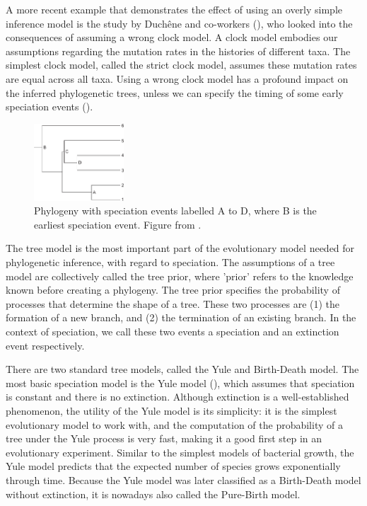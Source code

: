 A more recent example that demonstrates the effect of using an overly simple 
inference model is the study by Duch{\^e}ne and co-workers (\cite{duchene2014impact}),
who looked into the consequences of assuming a wrong clock model. 
A clock model embodies our assumptions regarding the mutation rates in
the histories of different taxa. The simplest clock model, called the strict
clock model, assumes these mutation rates are equal across all taxa.
Using a wrong clock model has a profound impact 
on the inferred phylogenetic trees, unless we can
specify the timing of some early speciation 
events (\cite{duchene2014impact}).

\begin{figure}[H]
  \includegraphics[width=0.3\textwidth]{duchene_et_al_2014_fig_1.png}
  \caption{
    Phylogeny with speciation events labelled A to D,
    where B is the earliest speciation event.
    Figure from \cite{duchene2014impact}.
 }
  \label{fig:duchene2014impact}
\end{figure}

The tree model is the most important part of the evolutionary model needed for phylogenetic inference,
with regard to speciation. The assumptions of a tree model are collectively 
called the tree prior, where 'prior' refers to the knowledge
known before creating a phylogeny. The tree prior specifies the probability of
processes that determine the shape of a tree. These
two processes are (1) the formation of a new branch, 
and (2) the termination of
an existing branch. In the context of speciation, we call these
two events a speciation and an extinction event respectively.

There are two standard tree models, called the Yule
and Birth-Death model. The most basic speciation model
is the Yule model (\cite{yule1925mathematical}), 
which assumes that speciation
is constant and there is no extinction.
Although extinction is a well-established phenomenon, 
the utility of the Yule model is its simplicity: it is the
simplest evolutionary model to work with, and the computation
of the probability of a tree under the Yule process is very fast,
making it a good first step in an evolutionary experiment.
Similar to the simplest models of bacterial growth,
the Yule model predicts that the expected number of species 
grows exponentially through time.
Because the Yule model 
was later classified as a Birth-Death model without extinction,
it is nowadays also called the Pure-Birth model.

